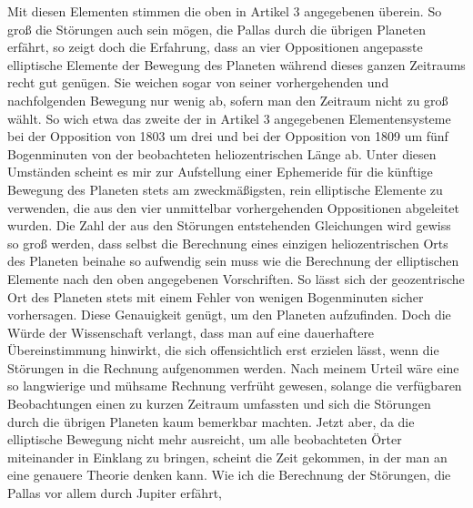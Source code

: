 Mit diesen Elementen stimmen die oben in Artikel 3 angegebenen überein.
So groß die Störungen auch sein mögen, die Pallas durch die übrigen Planeten erfährt, so zeigt doch die Erfahrung, dass an vier Oppositionen angepasste elliptische Elemente der Bewegung des Planeten während dieses ganzen Zeitraums recht gut genügen. Sie weichen sogar von seiner vorhergehenden und nachfolgenden Bewegung nur wenig ab, sofern man den Zeitraum nicht zu groß wählt. So wich etwa das zweite der in Artikel 3 angegebenen Elementensysteme bei der Opposition von 1803 um drei und bei der Opposition von 1809 um fünf Bogenminuten von der beobachteten heliozentrischen Länge ab. Unter diesen Umständen scheint es mir zur Aufstellung einer Ephemeride für die künftige Bewegung des Planeten stets am zweckmäßigsten, rein elliptische Elemente zu verwenden, die aus den vier unmittelbar vorhergehenden Oppositionen abgeleitet wurden. Die Zahl der aus den Störungen entstehenden Gleichungen wird gewiss so groß werden, dass selbst die Berechnung eines einzigen heliozentrischen Orts des Planeten beinahe so aufwendig sein muss wie die Berechnung der elliptischen Elemente nach den oben angegebenen Vorschriften. So lässt sich der geozentrische Ort des Planeten stets mit einem Fehler von wenigen Bogenminuten sicher vorhersagen. Diese Genauigkeit genügt, um den Planeten aufzufinden.
Doch die Würde der Wissenschaft verlangt, dass man auf eine dauerhaftere Übereinstimmung hinwirkt, die sich offensichtlich erst erzielen lässt, wenn die Störungen in die Rechnung aufgenommen werden. Nach meinem Urteil wäre eine so langwierige und mühsame Rechnung verfrüht gewesen, solange die verfügbaren Beobachtungen einen zu kurzen Zeitraum umfassten und sich die Störungen durch die übrigen Planeten kaum bemerkbar machten. Jetzt aber, da die elliptische Bewegung nicht mehr ausreicht, um alle beobachteten Örter miteinander in Einklang zu bringen, scheint die Zeit gekommen, in der man an eine genauere Theorie denken kann. Wie ich die Berechnung der Störungen, die Pallas vor allem durch Jupiter erfährt,
